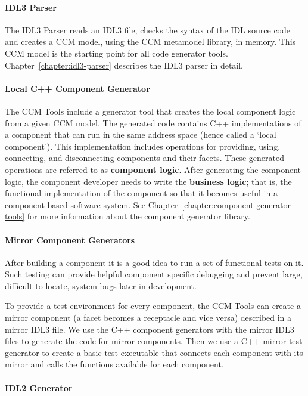 \paragraph{IDL3 Parser}

The IDL3 Parser reads an IDL3 file, checks the syntax of the IDL source code and
creates a CCM model, using the CCM metamodel library, in memory. This CCM model
is the starting point for all code generator tools.
Chapter~\ref{chapter:idl3-parser} describes the IDL3 parser in detail.

\paragraph{Local C++ Component Generator}

The CCM Tools include a generator tool that creates the local component logic
from a given CCM model. The generated code contains C++ implementations of a
component that can run in the same address space (hence called a `local
component'). This implementation includes operations for providing, using,
connecting, and disconnecting components and their facets. These generated
operations are referred to as {\bf component logic}. After generating the
component logic, the component developer needs to write the {\bf business
logic}; that is, the functional implementation of the component so that it
becomes useful in a component based software system. See
Chapter~\ref{chapter:component-generator-tools} for more information about the
component generator library.

\paragraph{Mirror Component Generators}

After building a component it is a good idea to run a set of functional tests on
it. Such testing can provide helpful component specific debugging and prevent
large, difficult to locate, system bugs later in development.

To provide a test environment for every component, the CCM Tools can create a
mirror component (a facet becomes a receptacle and vice versa) described in a
mirror IDL3 file. We use the C++ component generators with the mirror IDL3 files
to generate the code for mirror components. Then we use a C++ mirror test
generator to create a basic test executable that connects each component with
its mirror and calls the functions available for each component.

\paragraph{IDL2 Generator}

